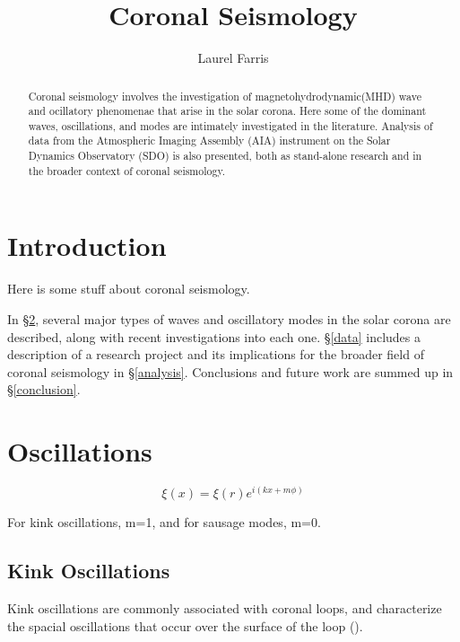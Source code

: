 \documentclass[preprint2]{aastex}
\newcommand{\mhd}{magnetohydrodynamic}
\begin{document}
\title{\vspace{-0.75in}Coronal Seismology}
\author{\vspace{-0.25in}Laurel Farris}

\begin{abstract}
Coronal seismology involves the investigation of \mhd (MHD) wave and
ocillatory phenomenae that arise in the solar corona. Here some of the
dominant waves, oscillations, and modes are intimately investigated in
the literature. Analysis of data from the Atmospheric Imaging
Assembly (AIA) instrument on the Solar Dynamics Observatory (SDO) is
also presented, both as stand-alone research and in the broader
context of coronal seismology.
\end{abstract}

\section{Introduction}\label{intro}
Here is some stuff about coronal seismology.

In \S\ref{MHD}, several major types of waves and oscillatory modes in
the solar corona are described, along with recent investigations into
each one. \S\ref{data} includes a description of a research project and
its implications for the broader field of coronal seismology in
\S\ref{analysis}. Conclusions and future work are summed up in
\S\ref{conclusion}.


\section{Oscillations}\label{MHD}

$$ \xi(x) = \xi(r)e^{i(kx+m\phi)} $$

For kink oscillations, m=1, and for sausage
modes, m=0.

\subsection{Kink Oscillations}
Kink oscillations are commonly associated with coronal loops, and
characterize the spacial oscillations that occur over the surface of
the loop (\cite{Nak}).


\end{document}
